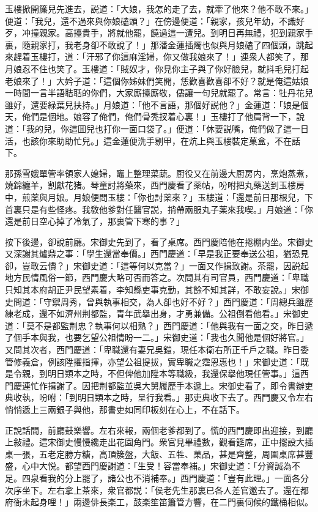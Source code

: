 玉樓掀開簾兒先進去，説道：「大娘，我怎的走了去，就牽了他來？他不敢不來。」便道：「我兒，還不過來與你娘磕頭？」在傍邊便道：「親家，孩兒年幼，不識好歹，冲撞親家。高擡貴手，將就他罷，饒過這一遭兒。到明日再無禮，犯到親家手裏，隨親家打，我老身卻不敢說了！」那潘金蓮插燭也似與月娘磕了四個頭，跳起來趕着玉樓打，道：「汗邪了你這麻淫婦，你又做我娘來了！」連衆人都笑了，那月娘忍不住也笑了。玉樓道：「賊奴才，你見你主子與了你好臉兒，就抖毛兒打起老娘來了！」大妗子道：「這個你姊妹們笑開，恁歡喜歡喜卻不好？就是俺這姑娘一時間一言半語聐聒的你們，大家廝擡廝敬，儘讓一句兒就罷了。常言：牡丹花兒雖好，還要緑葉兒扶持。」月娘道：「他不言語，那個好説他？」金蓮道：「娘是個天，俺們是個地。娘容了俺們，俺們骨秃扠着心裏！」玉樓打了他肩背一下，說道：「我的兒，你這囬兒也打你一面口袋了。」便道：「休要説嘴，俺們做了這一日活，也該你來助助忙兒。」這金蓮便洗手剔甲，在炕上與玉樓裝定菓盒，不在話下。

那孫雪娥單管率領家人媳婦，竈上整理菜蔬。厨役又在前邊大厨房内，烹炮蒸煮，燒錦纏羊，割獻花猪。琴童討將藥來，西門慶看了薬帖，吩咐把丸藥送到玉樓房中，煎薬與月娘。月娘便問玉樓：「你也討薬來？」玉樓道：「還是前日那根兒，下首裏只是有些怪疼。我敎他爹對任醫官説，捎帶兩服丸子薬來我喫。」月娘道：「你還是前日空心掉了冷氣了，那裏管下寒的事？」

按下後邊，卻說前廳。宋御史先到了，看了桌席。西門慶陪他在捲棚内坐。宋御史又深謝其爐鼎之事：「學生還當奉價。」西門慶道：「早是我正要奉送公祖，猶恐見卻，豈敢云價？」宋御史道：「這等何以克當？」一面又作揖致謝。茶罷，因説起地方民情風俗一節，西門慶大略可否而答之。次問其有司官員，西門慶道：「卑職只知其本府胡正尹民望素着，李知縣吏事克勤，其餘不知其詳，不敢妄說。」宋御史問道：「守禦周秀，曾與執事相交，為人卻也好不好？」西門慶道：「周總兵雖歷練老成，還不如濟州荆都監，青年武擧出身，才勇兼備。公祖倒看他看。」宋御史道：「莫不是都監荆忠？執事何以相熟？」西門慶道：「他與我有一面之交，昨日遞了個手本與我，也要乞望公祖情盼一二。」宋御史道：「我也久聞他是個好將官。」又問其次者，西門慶道：「卑職還有妻兄吳鎧，現任本衛右所正千戶之職。昨日委管修義倉，例該陞擢指揮，亦望公祖提拔，實卑職之霑恩惠也！」宋御史道：「既是令親，到明日類本之時，不但俾他加陞本等職級，我還保擧他現任管事。」這西門慶連忙作揖謝了。因把荆都監並吳大舅履歷手本遞上。宋御史看了，即令書辦吏典收執，吩咐：「到明日類本之時，呈行我看。」那吏典收下去了。西門慶又令左右悄悄遞上三兩銀子與他，那書吏如同印板刻在心上，不在話下。

正說話間，前廳鼓樂響。左右來報，兩個老爹都到了。慌的西門慶即出迎接，到廳上敍禮。這宋御史慢慢纔走出花園角門。衆官見畢禮數，觀看筵席，正中擺設大插桌一張，五老定勝方糖，高頂簇盤，大飯、五牲、菓品，甚是齊整，周圍桌席甚豐盛，心中大悦。都望西門慶謝道：「生受！容當奉補。」宋御史道：「分資誠為不足。四泉看我的分上罷了，諸公也不消補奉。」西門慶道：「豈有此理。」一面各分次序坐下。左右拿上茶來，衆官都説：「侯老先生那裏已各人差官邀去了。還在都府衙未起身哩！」兩邊俳長楽工，鼓楽笙笛簫管方響，在二門裏伺候的鐵桶相似。

